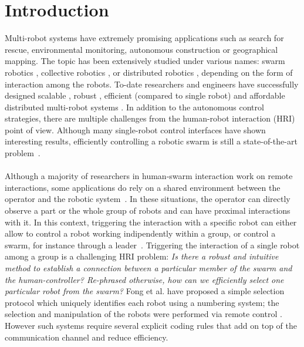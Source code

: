 \documentclass[smallextended]{svjour3}
\begin{document}
\section{Introduction}
\label{sec:introduction}
Multi-robot systems have extremely promising applications such as search for rescue, environmental monitoring, autonomous construction or geographical mapping. 
The topic has been extensively studied under various names: swarm robotics \cite{brambilla2013}, collective robotics \cite{kernbach2013handbook}, or distributed robotics \cite{martinoli2012distributed}, depending on the form of interaction among the robots. 
To-date researchers and engineers have successfully designed scalable \cite{rubenstein2012kilobot}, robust \cite{winfield2006safety}, efficient (compared to single robot) \cite{Bonani2012} and affordable distributed multi-robot systems \cite{rubenstein2014programmable}. 
In addition to the autonomous control strategies, there are multiple challenges from the human-robot interaction (HRI) point of view. 
Although many single-robot control interfaces have shown interesting results, efficiently controlling a robotic swarm is still a state-of-the-art problem~\cite{Kolling2016}.\\
\\
Although a majority of researchers in human-swarm interaction work on remote interactions, some applications do rely on a shared environment between the operator and the robotic system~\cite{Kolling2016}. 
In these situations, the operator can directly observe a part or the whole group of robots and can have proximal interactions with it. 
In this context, triggering the interaction with a specific robot can either allow to control a robot working indipendently within a group, or control a swarm, for instance through a leader~\cite{Goodrich2012}.
Triggering the interaction of a single robot among a group is a challenging HRI problem: \textit{Is there a robust and intuitive method to establish a connection between a particular member of the swarm and the human-controller? Re-phrased otherwise, how can we efficiently select one particular robot from the swarm?} Fong et al. have proposed a simple selection protocol which uniquely identifies each robot using a numbering system; the selection and manipulation of the robots were performed via remote control \cite{fong2003}. 
However such systems require several explicit coding rules that add on top of the communication channel and reduce efficiency. 
\end{document}
